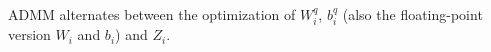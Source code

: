 \documentclass{article}
\begin{document}
ADMM alternates between the optimization of $W_i^q$, $b_i^q$ (also the floating-point version $W_i$ and $b_i$) and $Z_i$.











\end{document}
